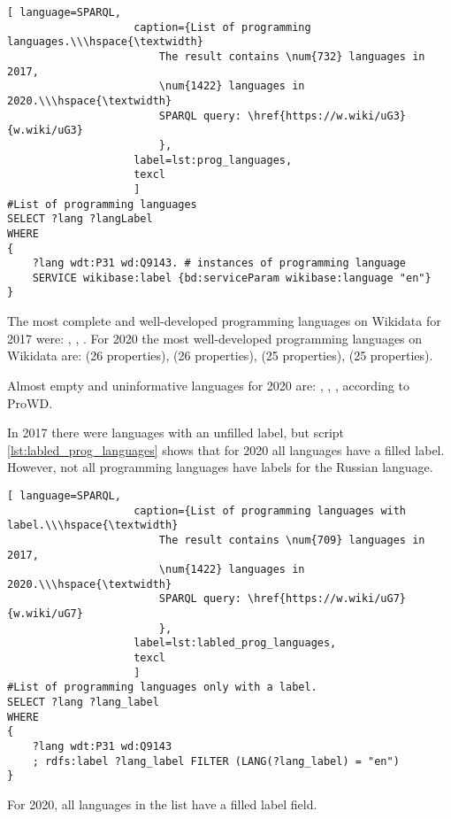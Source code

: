 \begin{lstlisting}[ language=SPARQL, 
                    caption={List of programming languages.\\\hspace{\textwidth}
                        The result contains \num{732} languages in 2017, 
                        \num{1422} languages in 2020.\\\hspace{\textwidth}
                        SPARQL query: \href{https://w.wiki/uG3}{w.wiki/uG3}
                        },
                    label=lst:prog_languages,
                    texcl 
                    ]
#List of programming languages
SELECT ?lang ?langLabel
WHERE
{
    ?lang wdt:P31 wd:Q9143. # instances of programming language
    SERVICE wikibase:label {bd:serviceParam wikibase:language "en"}
}
\end{lstlisting}%

The most complete and well-developed programming languages on Wikidata for 2017 were: , , . For 2020 the most well-developed programming languages on Wikidata are:  (26 properties),  (26 properties),  (25 properties),  (25 properties).

Almost empty and uninformative languages for 2020 are: , , ,  according to ProWD\cite{prowd_langs}.

In 2017 there were languages with an unfilled label, but script \ref{lst:labled_prog_languages} shows that for 2020 all languages have a filled label. However, not all programming languages have labels for the Russian language.

\begin{lstlisting}[ language=SPARQL, 
                    caption={List of programming languages with label.\\\hspace{\textwidth}
                        The result contains \num{709} languages in 2017, 
                        \num{1422} languages in 2020.\\\hspace{\textwidth}
                        SPARQL query: \href{https://w.wiki/uG7}{w.wiki/uG7}
                        },
                    label=lst:labled_prog_languages,
                    texcl 
                    ]
#List of programming languages only with a label.
SELECT ?lang ?lang_label
WHERE
{
    ?lang wdt:P31 wd:Q9143
    ; rdfs:label ?lang_label FILTER (LANG(?lang_label) = "en") 
}
\end{lstlisting}%
For 2020, all languages in the list have a filled label field.

